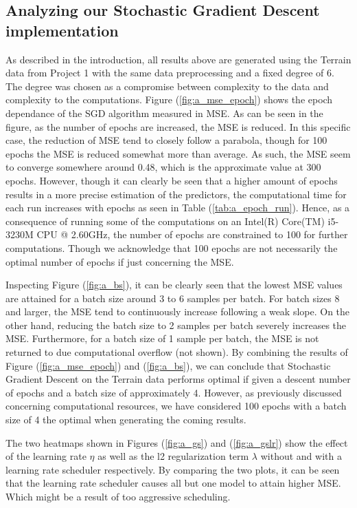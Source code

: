 \documentclass
[twocolumn,
secnumarabic,
nobibnotes,
aps,
prl,
reprint,
groupedaddress,
amsmath,
amssymb
]{revtex4-2}
\begin{document}
\subsection{Analyzing our Stochastic Gradient Descent implementation}
As described in the introduction, all results above are generated using the Terrain data from Project 1 with the same data preprocessing and a fixed degree of 6. The degree was chosen as a compromise between complexity to the data and complexity to the computations.
Figure (\ref{fig:a_mse_epoch}) shows the epoch dependance of the SGD algorithm measured in MSE. As can be seen in the figure, as the number of epochs are increased, the MSE is reduced. In this specific case, the reduction of MSE tend to closely follow a parabola, though for 100 epochs the MSE is reduced somewhat more than average. As such, the MSE seem to converge somewhere around 0.48, which is the approximate value at 300 epochs. However, though it can clearly be seen that a higher amount of epochs results in a more precise estimation of the predictors, the computational time for each run increases with epochs as seen in Table (\ref{tab:a_epoch_run}). Hence, as a consequence of running some of the computations on an Intel(R) Core(TM) i5-3230M CPU @ 2.60GHz, the number of epochs are constrained to 100 for further computations. Though we acknowledge that 100 epochs are not necessarily the optimal number of epochs if just concerning the MSE.

Inspecting Figure (\ref{fig:a_bs}), it can be clearly seen that the lowest MSE values are attained for a batch size around 3 to 6 samples per batch. For batch sizes 8 and larger, the MSE tend to continuously increase following a weak slope. On the other hand, reducing the batch size to 2 samples per batch severely increases the MSE. Furthermore, for a batch size of 1 sample per batch, the MSE is not returned to due computational overflow (not shown). By combining the results of Figure (\ref{fig:a_mse_epoch}) and (\ref{fig:a_bs}), we can conclude that Stochastic Gradient Descent on the Terrain data performs optimal if given a descent number of epochs and a batch size of approximately 4. However, as previously discussed concerning computational resources, we have considered 100 epochs with a batch size of 4 the optimal when generating the coming results.

The two heatmaps shown in Figures (\ref{fig:a_gs}) and (\ref{fig:a_gslr}) show the effect of the learning rate $\eta$ as well as the l2 regularization term $\lambda$ without and with a learning rate scheduler respectively. By comparing the two plots, it can be seen that the learning rate scheduler causes all but one model to attain higher MSE. Which might be a result of too aggressive scheduling.
\end{document}
